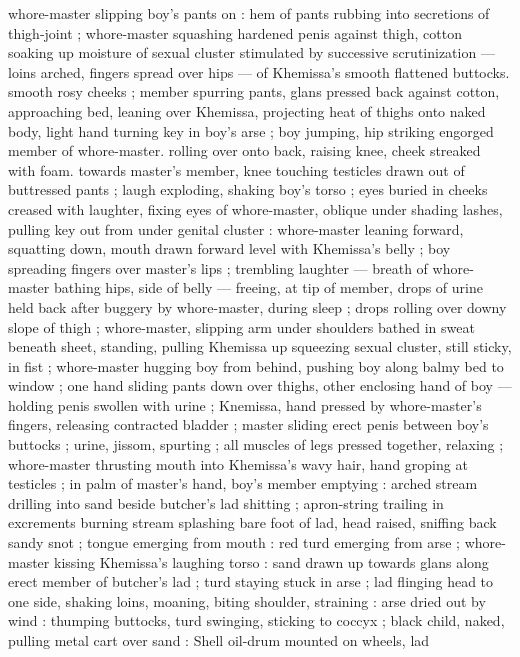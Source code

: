 whore-master slipping boy's pants on : hem of pants rubbing into 
secretions of thigh-joint ; whore-master squashing hardened penis 
against thigh, cotton soaking up moisture of sexual cluster 
stimulated by successive scrutinization --- loins arched, fingers 
spread over hips --- of Khemissa's smooth flattened buttocks. 
smooth rosy cheeks ; member spurring pants, glans pressed back 
against cotton, approaching bed, leaning over Khemissa, projecting 
heat of thighs onto naked body, light hand turning key in boy's arse 
; boy jumping, hip striking engorged member of whore-master. 
rolling over onto back, raising knee, cheek streaked with foam. 
towards master's member, knee touching testicles drawn out of 
buttressed pants ; laugh exploding, shaking boy's torso ; eyes buried 
in cheeks creased with laughter, fixing eyes of whore-master, oblique 
under shading lashes, pulling key out from under genital cluster : 
whore-master leaning forward, squatting down, mouth drawn forward 
level with Khemissa's belly ; boy spreading fingers over master's lips 
; trembling laughter --- breath of whore-master bathing hips, side of 
belly --- freeing, at tip of member, drops of urine held back after 
buggery by whore-master, during sleep ; drops rolling over downy 
slope of thigh ; whore-master, slipping arm under shoulders bathed 
in sweat beneath sheet, standing, pulling Khemissa up squeezing 
sexual cluster, still sticky, in fist ; whore-master hugging boy from 
behind, pushing boy along balmy bed to window ; one hand sliding 
pants down over thighs, other enclosing hand of boy --- holding 
penis swollen with urine ; Knemissa, hand pressed by whore-master's 
fingers, releasing contracted bladder ; master sliding erect penis 
between boy's buttocks ; urine, jissom, spurting ; all muscles of legs 
pressed together, relaxing ; whore-master thrusting mouth into 
Khemissa's wavy hair, hand groping at testicles ; in palm of master's 
hand, boy's member emptying : arched stream drilling into sand 
beside butcher's lad shitting ; apron-string trailing in excrements 
burning stream splashing bare foot of lad, head raised, sniffing back 
sandy snot ; tongue emerging from mouth : red turd emerging from 
arse ; whore-master kissing Khemissa's laughing torso : sand drawn 
up towards glans along erect member of butcher's lad ; turd staying 
stuck in arse ; lad flinging head to one side, shaking loins, moaning, 
biting shoulder, straining : arse dried out by wind : thumping 
buttocks, turd swinging, sticking to coccyx ; black child, naked, 
pulling metal cart over sand : Shell oil-drum mounted on wheels, lad 
